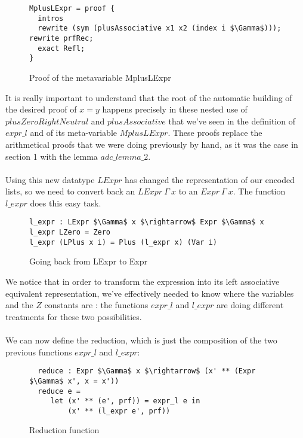 \begin{figure}[H]
\figrule
\begin{center}
\begin{lstlisting}
MplusLExpr = proof {
  intros
  rewrite (sym (plusAssociative x1 x2 (index i $\Gamma$))); rewrite prfRec; 
  exact Refl;
}
\end{lstlisting}
\end{center}
\caption{Proof of the metavariable MplusLExpr}
\label{MplusExpr}
\figrule
\end{figure}

It is really important to understand that the root of the automatic building of the desired proof of $x=y$ happens precisely in these nested use of $plusZeroRightNeutral$ and $plusAssociative$ that we've seen in the definition of $expr\_l$ and of its meta-variable $MplusLExpr$. These proofs replace the arithmetical proofs that we were doing previously by hand, as it was the case in section 1 with the lemma $adc\_lemma\_2$. \\
\\
Using this new datatype $LExpr$ has changed the representation of our encoded lists, so we need to convert back an $LExpr\ \Gamma\ x$ to an $Expr\ \Gamma\ x$. The function $l\_expr$ does this easy task.
\begin{figure}[H]
\figrule
\begin{center}
\begin{lstlisting}
l_expr : LExpr $\Gamma$ x $\rightarrow$ Expr $\Gamma$ x
l_expr LZero = Zero
l_expr (LPlus x i) = Plus (l_expr x) (Var i)
\end{lstlisting}
\end{center}
\caption{Going back from LExpr to Expr}
\label{l_expr}
\figrule
\end{figure}


We notice that in order to transform the expression into its left associative equivalent representation, we've effectively needed to know where the variables and the $Z$ constants are : the functions $expr\_l$ and $l\_expr$ are doing different treatments for these two possibilities. \\
\\

We can now define the reduction, which is just the composition of the two previous functions $expr\_l$ and $l\_expr$:

\begin{figure}[H]
\figrule
\begin{center}
\begin{lstlisting}
  reduce : Expr $\Gamma$ x $\rightarrow$ (x' ** (Expr $\Gamma$ x', x = x'))
  reduce e = 
     let (x' ** (e', prf)) = expr_l e in
         (x' ** (l_expr e', prf))
\end{lstlisting}
\end{center}
\caption{Reduction function}
\label{reduce}
\figrule
\end{figure}


